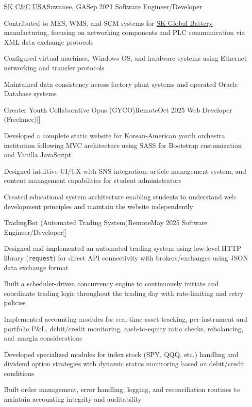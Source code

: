 \begin{resume-itemize}
  {\href{https://www.skaxus.com/}{SK C\&C USA}}{Suwanee, GA}{Sep 2021}
  {Software Engineer/Developer}
  \item Contributed to MES, WMS, and SCM systems for \href{https://www.skbatteryamerica.com/}{SK Global Battery} manufacturing, 
  focusing on networking components and PLC communication via XML data exchange protocols
  \item Configured virtual machines, Windows OS, and hardware systems using Ethernet networking and transfer protocols
  \item Maintained data consistency across factory plant systems and operated Oracle Database systems
\end{resume-itemize}
\begin{resume-itemize}
  {Greater Youth Collaborative Opus (GYCO)}{Remote}{Oct 2025}
  {Web Developer (Freelance)}[\href{https://github.com/kate-yk/kate-yk.github.io}{}]
  \item Developed a complete static \href{https://kate-yk.github.io/index.html}{website} for Korean-American youth orchestra institution 
  following MVC architecture using SASS for Bootstrap customization and Vanilla JavaScript
  \item Designed intuitive UI/UX with SNS integration, article management system, 
  and content management capabilities for student administrators
  \item Created educational system architecture enabling students to understand 
  web development principles and maintain the website independently
\end{resume-itemize}
\begin{resume-itemize}
  {TradingBot (Automated Trading System)}{Remote}{May 2025}
  {Software Engineer/Developer}[\href{https://github.com/YundaeLeeSong/ydjs-references/tree/main/project2505-app_tradingbot}{}]
  \item Designed and implemented an automated trading system using low-level HTTP library (\texttt{request}) 
  for direct API connectivity with brokers/exchanges using JSON data exchange format
  \item Built a scheduler-driven concurrency engine to continuously initiate and coordinate trading logic 
  throughout the trading day with rate-limiting and retry policies
  \item Implemented accounting modules for real-time asset tracking, per-instrument and portfolio P\&L, 
  debit/credit monitoring, cash-to-equity ratio checks, rebalancing, and margin considerations
  \item Developed specialized modules for index 
  stock (SPY, QQQ, etc.) handling and dividend option strategies 
  with dynamic status monitoring based on debit/credit conditions
  \item Built order management, error handling, logging, and reconciliation routines 
  to maintain accounting integrity and auditability
\end{resume-itemize}
